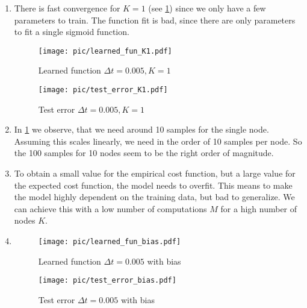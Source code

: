 \documentclass[a4paper,11pt]{scrartcl}
\newcommand*{\Dt}{\Delta{}t}
\begin{document}
\begin{enumerate}
\begin{enumerate}[leftmargin=1em]
  \item
    There is fast convergence for $K=1$ (see \cref{fig:test_error_K1}) since we
    only have a few parameters to train.
    The function fit is bad, since there are only parameters to fit a single
    sigmoid function.

    \begin{figure}[h]
        \begin{minipage}[b]{.5\linewidth}
          \centering
          \texttt{[image: pic/learned\_fun\_K1.pdf]}
          \caption{Learned function $\Dt=0.005, K=1$}
          \label{fig:learned_fun_K1}
        \end{minipage}%
        \begin{minipage}[b]{.5\linewidth}
          \centering
          \texttt{[image: pic/test\_error\_K1.pdf]}
          \caption{Test error $\Dt=0.005, K=1$}
          \label{fig:test_error_K1}
        \end{minipage}
    \end{figure}

   \item
     In \cref{fig:test_error_K1} we observe, that we need around 10 samples for
     the single node.
     Assuming this scales linearly, we need in the order of 10 samples per node.
     So the 100 samples for 10 nodes seem to be the right order of magnitude.

   \item
     To obtain a small value for the empirical cost function, but a large value
     for the expected cost function, the model needs to overfit.
     This means to make the model highly dependent on the training data, but bad
     to generalize.
     We can achieve this with a low number of computations $M$ for a high number
     of nodes $K$.

   \item
    \begin{figure}[h]
        \begin{minipage}[b]{.5\linewidth}
          \centering
          \texttt{[image: pic/learned\_fun\_bias.pdf]}
          \caption{Learned function $\Dt=0.005$ with bias}
          \label{fig:learned_fun_bias}
        \end{minipage}%
        \begin{minipage}[b]{.5\linewidth}
          \centering
          \texttt{[image: pic/test\_error\_bias.pdf]}
          \caption{Test error $\Dt=0.005$ with bias}
          \label{fig:test_error_bias}
        \end{minipage}
    \end{figure}


\end{enumerate}
\end{enumerate}
\end{document}
